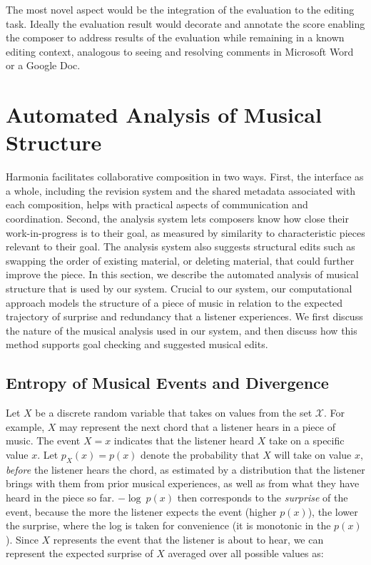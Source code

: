 \documentclass[final,authoryear,5p,times,twocolumn]{elsarticle}
\begin{document}
The most novel aspect would be the integration of the evaluation to the editing task. Ideally the evaluation result would decorate and annotate the score enabling the composer to address results of the evaluation while remaining in a known editing context, analogous to seeing and resolving comments in Microsoft Word or a Google Doc.

\section{Automated Analysis of Musical Structure}

Harmonia facilitates collaborative composition in two ways. First, the interface as a whole, including the revision system and the shared metadata associated with each composition, helps with practical aspects of communication and coordination. Second, the analysis system lets composers know how close their work-in-progress is to their goal, as measured by similarity to characteristic pieces relevant to their goal. The analysis system also suggests structural edits such as swapping the order of existing material, or deleting material, that could further improve the piece. In this section, we describe the automated analysis of musical structure that is used by our system. Crucial to our system, our computational approach models the structure of a piece of music in relation to the expected trajectory of surprise and redundancy that a listener experiences. We first discuss the nature of the musical analysis used in our system, and then discuss how this method supports goal checking and suggested musical edits.

\subsection{Entropy of Musical Events and Divergence}
 
Let $X$ be a discrete random variable that takes on values from the set $\mathcal{X}$. For example, $X$ may represent the next chord that a listener hears in a piece of music. The event $X=x$ indicates that the listener heard $X$ take on a specific value $x$. Let $p_X(x) = p(x)$ denote the probability that $X$ will take on value $x$, \textit{before} the listener hears the chord, as estimated by a distribution that the listener brings with them from prior musical experiences, as well as from what they have heard in the piece so far. $-\log\ p(x)$ then corresponds to the \textit{surprise} of the event, because the more the listener expects the event (higher $p(x)$), the lower the surprise, where the log is taken for convenience (it is monotonic in the $p(x)$). Since $X$ represents the event that the listener is about to hear, we can represent the expected surprise of $X$ averaged over all possible values as:
 
\end{document}
